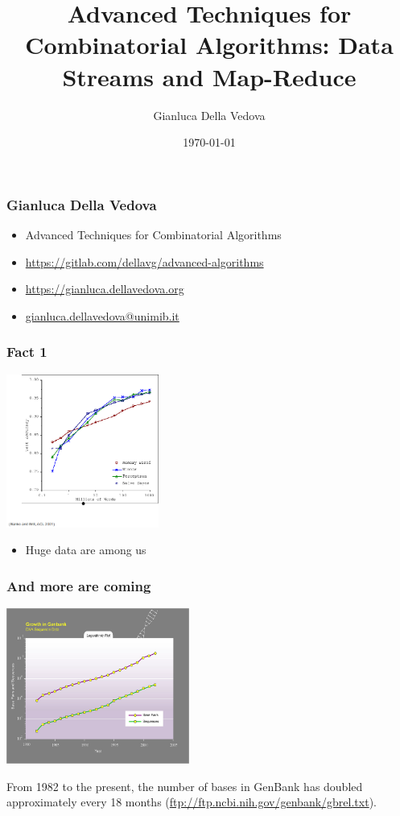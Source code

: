 \documentclass[12pt,aspectratio=169]{beamer}
\author{Gianluca Della Vedova}
\title[Advanced Algorithms]{Advanced Techniques for Combinatorial Algorithms:
Data Streams and Map-Reduce}
\institute[]{Univ. Milano--Bicocca\\
  \texttt{https://gianluca.dellavedova.org}}
\date[]{{\tiny \today\hspace{1em} \vcsShortHash}}
\begin{document}
\begin{frame}
  \titlepage
\end{frame}


\begin{frame}\frametitle{Gianluca Della Vedova}
  \begin{itemize}
  \item
                Advanced Techniques for Combinatorial Algorithms
\item
{\small\url{https://gitlab.com/dellavg/advanced-algorithms}}
  \item
{\small\url{https://gianluca.dellavedova.org}}
  \item
{\small\url{gianluca.dellavedova@unimib.it}}
  \end{itemize}
\end{frame}

\begin{frame}\frametitle{Fact 1}
  \includegraphics[width=5cm]{img/growing-data-1}
  \begin{itemize}
  \item
    Huge data are among us
  \end{itemize}
\end{frame}


\begin{frame}\frametitle{And more are coming}
  \includegraphics[width=6cm]{img/Kurzweil_DNA_Sequence_data_growth,_base_pairs_and_sequences_per_year}

  \small
  From 1982 to the present, the number of bases in GenBank has doubled
approximately every 18 months (\url{ftp://ftp.ncbi.nih.gov/genbank/gbrel.txt}).
\end{frame}
\end{document}
